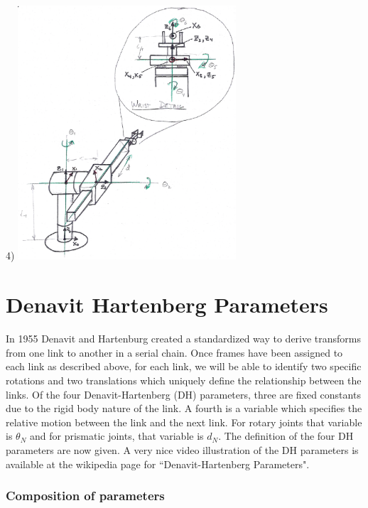 \begin{Example}
4) \includegraphics[width=3.2in]{figs03/00419.eps}

\label{FKex2}
\end{Example}



\section{Denavit Hartenberg Parameters}

In 1955 Denavit and Hartenburg created a standardized way to derive transforms from one link to another in a serial chain.  Once frames have been assigned to each link as described above, for each link, we will be able to identify two specific rotations and two translations which uniquely define the relationship between the links.  Of the four Denavit-Hartenberg (DH) parameters, three are fixed constants due to the rigid body nature of the link.  A fourth is a variable which specifies the relative motion between the link and the next link.  For rotary joints that variable is $\theta_N$ and for prismatic joints, that variable is $d_N$.  The definition of the four DH parameters are now given.    A very nice video illustration of the DH parameters is available at the wikipedia page for ``Denavit-Hartenberg Parameters".

\subsubsection{Composition of parameters}

